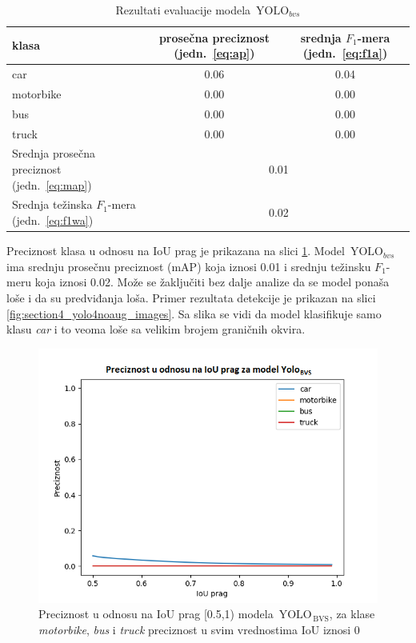 \documentclass[12pt,oneside]{memoir}
\newcommand{\yolo}{\ensuremath{\,\textrm{YOLO}}}
\newcommand{\bvs}{\ensuremath{\,\textrm{BVS}}}
\begin{document}
\begin{table}
    \begin{center}
    \caption{Rezultati evaluacije modela $\yolo_{bvs}$}
        \begin{tabular}{|m{10em}|c|c|}
        \toprule
        klasa     & prosečna preciznost (jedn.~\ref{eq:ap}) & srednja $F_1$-mera (jedn.~\ref{eq:f1a})  \\ \hline
        \midrule
        car       & 0.06  & 0.04 \\ \hline
        motorbike & 0.00  & 0.00 \\ \hline
        bus       & 0.00  & 0.00 \\ \hline
        truck     & 0.00  & 0.00 \\ \hline
        \bottomrule
        Srednja prosečna preciznost (jedn.~\ref{eq:map}) & \multicolumn{2}{c|}{0.01}  \\ \hline
        Srednja težinska $F_1$-mera (jedn.~\ref{eq:f1wa}) & \multicolumn{2}{c|}{0.02}  \\ \hline
    \end{tabular}
    \label{tab:section4_yolo4noaug_results}
    \end{center}
\end{table}

Preciznost klasa u odnosu na IoU prag je prikazana na slici \ref{fig:section4_yolo4noaug_prc}. Model $\yolo_{bvs}$ ima srednju prosečnu preciznost (mAP) koja iznosi 0.01 i srednju težinsku $F_1$-meru koja iznosi 0.02. Može se žaključiti bez dalje analize da se model ponaša loše i da su predviđanja loša. Primer rezultata detekcije je prikazan na slici \ref{fig:section4_yolo4noaug_images}. Sa slika se vidi da model klasifikuje samo klasu \textit{car} i to veoma loše sa velikim brojem graničnih okvira.

\begin{figure}[!ht]
    \centering
    \includegraphics[width=1\textwidth]{matfmaster/glava4/precision_vs_iou_threshold_NOaugment.png}
    \caption{Preciznost u odnosu na IoU prag [0.5,1) modela $\yolo_{\bvs{}}$, za klase \textit{motorbike}, \textit{bus} i \textit{truck} preciznost u svim vrednostima IoU iznosi 0}
    \label{fig:section4_yolo4noaug_prc}
\end{figure}
\end{document}
